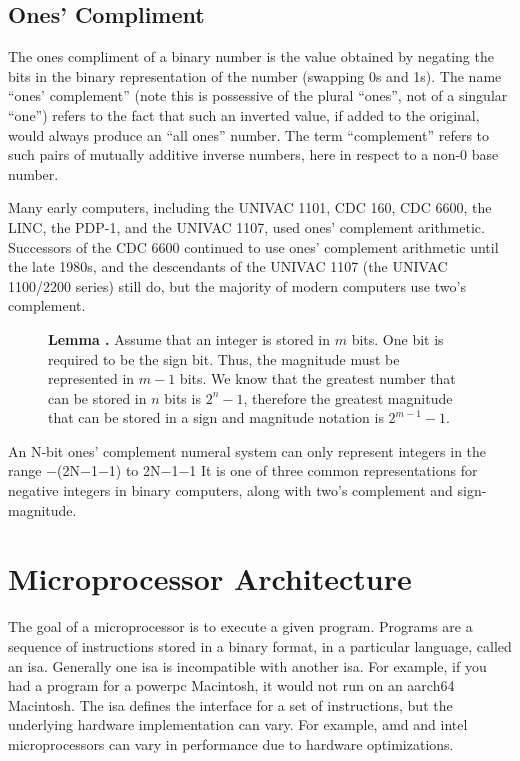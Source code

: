 \documentclass[letterpaper, 12pt]{book}
\newcommand*{\lemma}[1]{\noindent
    \colorbox{green!10}{\noindent
        \begin{minipage}{\textwidth}
            \textbf{Lemma \thechapter.\arabic{examples}}\stepcounter{lemma}
            #1
        \end{minipage}
    }
}
\begin{document}
\section{Ones' Compliment\label{sec:ones}}

The \gls{ones compliment} of a binary number is the value obtained by negating the bits in the binary representation of %
the number (swapping 0s and 1s). The name ``ones' complement'' (note this is possessive of the plural ``ones'', not of a %
singular ``one'') refers to the fact that such an inverted value, if added to the original, would always produce an ``all %
ones'' number. The term ``complement'' refers to such pairs of mutually additive inverse numbers, here in respect to a %
non-0 base number. 

Many early computers, including the UNIVAC 1101, CDC 160, CDC 6600, the LINC, the PDP-1, and the UNIVAC 1107, used ones' 
complement arithmetic. Successors of the CDC 6600 continued to use ones' complement arithmetic until the late 1980s, and 
the descendants of the UNIVAC 1107 (the UNIVAC 1100/2200 series) still do, but the majority of modern computers use two's 
complement. 

\begin{figure}[ht]
    \lemma{%
        Assume that an integer is stored in $m$ bits. One bit is required to be the sign bit. Thus, the magnitude %
        must be represented in $m - 1$ bits. We know that the greatest number that can be stored in $n$ bits is %
        $2^{n}-1$, therefore the greatest magnitude that can be stored in a sign and magnitude notation is $2^{m-1}-1$.%
    }
\end{figure}

An N-bit ones' complement numeral 
system can only represent integers in the range −(2N−1−1) to 2N−1−1 It is one of three common representations for 
negative integers in binary computers, along with two's complement and sign-magnitude.

\chapter{Microprocessor Architecture}

The goal of a microprocessor is to execute a given program. Programs are a sequence of instructions %
stored in a binary format, in a %
particular language, called an \gls{isa}. Generally one \gls{isa} is incompatible with another \gls{isa}. 
For example, if you had a program for a \gls{powerpc} Macintosh, it would not run on an \gls{aarch64} Macintosh. %
The \gls{isa} defines the interface for a set of instructions, but the underlying hardware implementation 
can vary. For example, \gls{amd} and \gls{intel} microprocessors can vary in performance due to hardware 
optimizations.
\end{document}
